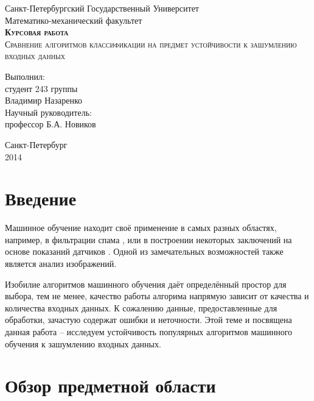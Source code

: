 \documentclass{article}
\begin{document}
\begin{titlepage}

\begin{center}
Санкт-Петербургский Государственный Университет\\
Математико-механический факультет\\
\vspace{12em}
\textsc{\textbf{Курсовая работа\\}Сравнение алгоритмов классификации на предмет устойчивости к зашумлению входных данных}
\end{center}
\vspace{10em}
\begin{flushright}
Выполнил:\\
студент 243 группы\\
Владимир Назаренко\\
\vspace{1em}
Научный руководитель:\\
профессор Б.А. Новиков
\end{flushright}
\vspace{\fill}
\center
Санкт-Петербург\\2014
\end{titlepage}



\section{Введение}
Машинное обучение находит своё применение в самых разных областях, например, в фильтрации спама \cite{spamFiltering}, или в построении некоторых заключений на основе показаний датчиков \cite{sensors}. Одной из замечательных возможностей также является анализ изображений.

Изобилие алгоритмов машинного обучения даёт определённый простор для выбора, тем не менее, качество работы алгорима напрямую зависит от качества и количества входных данных. К сожалению данные, предоставленные для обработки, зачастую содержат ошибки и неточности. Этой теме и посвящена данная работа -- исследуем устойчивость популярных алгоритмов машинного обучения к зашумлению входных данных.



\section{Обзор предметной области}
\end{document}
